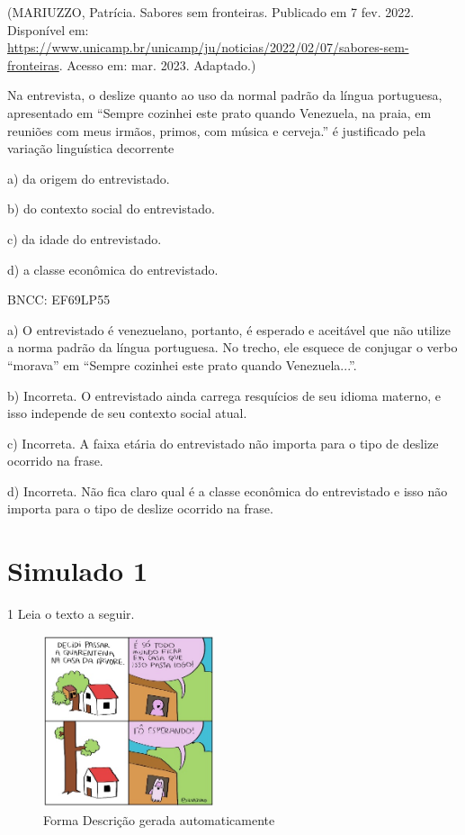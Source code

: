 {(MARIUZZO, Patrícia. Sabores sem fronteiras. Publicado em 7 fev. 2022.
Disponível em:
\url{https://www.unicamp.br/unicamp/ju/noticias/2022/02/07/sabores-sem-fronteiras}.
Acesso em: mar. 2023. Adaptado.)

Na entrevista, o deslize quanto ao uso da normal padrão da língua
portuguesa, apresentado em ``Sempre cozinhei este prato quando
Venezuela, na praia, em reuniões com meus irmãos, primos, com música e
cerveja.'' é justificado pela variação linguística decorrente

a) da origem do entrevistado.

b) do contexto social do entrevistado.

c) da idade do entrevistado.

d) a classe econômica do entrevistado.

BNCC: EF69LP55

a) O entrevistado é venezuelano, portanto, é esperado e aceitável que
não utilize a norma padrão da língua portuguesa. No trecho, ele esquece
de conjugar o verbo ``morava'' em ``Sempre cozinhei este prato quando
Venezuela...''.

b) Incorreta. O entrevistado ainda carrega resquícios de seu idioma
materno, e isso independe de seu contexto social atual.

c) Incorreta. A faixa etária do entrevistado não importa para o tipo de
deslize ocorrido na frase.

d) Incorreta. Não fica claro qual é a classe econômica do entrevistado e
isso não importa para o tipo de deslize ocorrido na frase.

\section{Simulado 1}

\num{1} Leia o texto a seguir.

\begin{figure}
\centering
\includegraphics[width=1.98077in,height=1.98077in]{./imgSAEB_6_POR/media/image34.jpeg}
\caption{Forma Descrição gerada automaticamente}
\end{figure}

}
